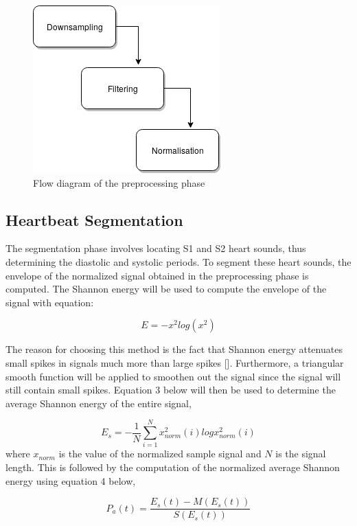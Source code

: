 \documentclass[10pt,twocolumn]{witseiepaper}
\begin{document}
\begin{figure}[h!]
    \centering
    \includegraphics[scale=0.6]{Project_Plan/preproc.png}
    \caption{Flow diagram of the preprocessing phase}
    \label{fig:pre}
\end{figure}{}

\subsection{Heartbeat Segmentation}
The segmentation phase involves locating S1 and S2 heart sounds, thus determining the diastolic and systolic periods. To segment these heart sounds, the envelope of the normalized signal obtained in the preprocessing phase is computed. The Shannon energy will be used to compute the envelope of the signal with equation:

\begin{equation}
    E = -x^2log(x^2)
\end{equation}{}

The reason for choosing this method is the fact that Shannon energy attenuates small spikes in signals much more than large spikes []. Furthermore, a triangular smooth function will be applied to smoothen out the signal since the signal will still contain small spikes. Equation 3 below will then be used to determine the average Shannon energy of the entire signal,

\begin{equation}
    E_s = -\frac{1}{N}\sum_{i=1}^{N} x_{norm}^{2}(i)logx_{norm}^{2}(i)
\end{equation}{}
 where \(x_{norm}\) is the value of the normalized sample signal and \(N\) is the signal length. This is followed by the computation of the normalized average Shannon energy using equation 4 below,
 
 \begin{equation}
     P_a(t) = \frac{E_s(t)-M(E_s(t))}{S(E_s(t))}
 \end{equation}{}
 
\end{document}
